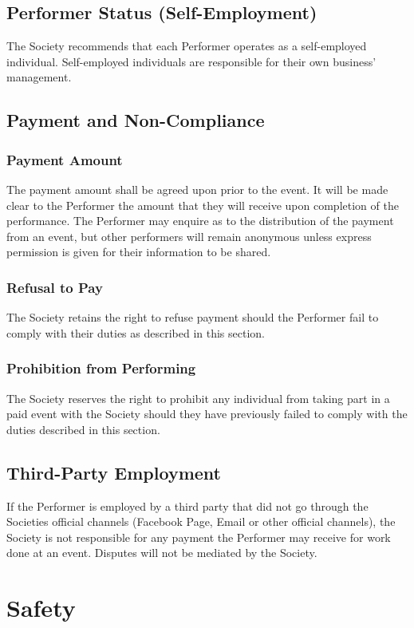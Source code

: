 \documentclass[11pt,a4paper]{article}
\begin{document}
\subsection{Performer Status (Self-Employment)}

The Society recommends that each Performer operates as a self-employed individual. Self-employed individuals are responsible for their own business' management.

\subsection{Payment and Non-Compliance}
\subsubsection{Payment Amount}
The payment amount shall be agreed upon prior to the event. It will be made clear to the Performer the amount that they will receive upon completion of the performance. The Performer may enquire as to the distribution of the payment from an event, but other performers will remain anonymous unless express permission is given for their information to be shared.

\subsubsection{Refusal to Pay}
The Society retains the right to refuse payment should the Performer fail to comply with their duties as described in this section.

\subsubsection{Prohibition from Performing}
The Society reserves the right to prohibit any individual from taking part in a paid event with the Society should they have previously failed to comply with the duties described in this section.

\subsection{Third-Party Employment}
If the Performer is employed by a third party that did not go through the Societies official channels (Facebook Page, Email or other official channels), the Society is not responsible for any payment the Performer may receive for work done at an event. Disputes will not be mediated by the Society.

\section{Safety}\label{sec:safety}
\end{document}
